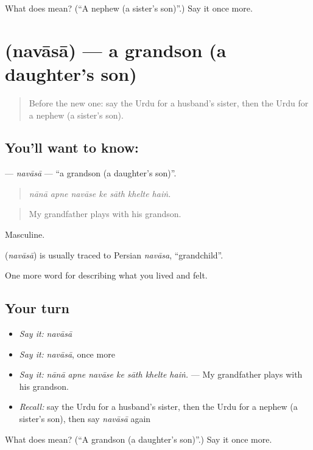 \begin{tcolorbox}[breakable,colback=teal!4,colframe=teal!35!black,title={Before you move on}]
What does  mean? (\textquotedblleft{}A nephew (a sister's son)\textquotedblright{}.) Say it once more.
\end{tcolorbox}
\section[\texorpdfstring{\ur{نواسا} (navāsā)}{نواسا (navāsā)}]{ (navāsā) — a grandson (a daughter's son)}

\label{lesson:UR-C489-navasa}



\begin{quote}
Before the new one: say the Urdu for a husband's sister, then the Urdu for a nephew (a sister's son).
\end{quote}

\subsection*{You'll want to know: }
\textbf{} — \emph{navāsā} — \textquotedblleft{}a grandson (a daughter's son)\textquotedblright{}.

\begin{quote}
      
\end{quote}

\begin{quote}
\emph{nānā apne navāse ke sāth khelte haiṅ.}
\end{quote}

\begin{quote}
My grandfather plays with his grandson.
\end{quote}

Masculine.

\begin{cousinweb}
\textbf{} (\emph{navāsā}) is usually traced to Persian \emph{navāsa}, \textquotedblleft{}grandchild\textquotedblright{}.
\end{cousinweb}

\begin{grammarlens}[title={What you've built}]
One more word for describing what you lived and felt.
\end{grammarlens}

\subsection*{Your turn}
\begin{itemize}
\raggedright
  \item \emph{Say it:} \emph{navāsā}
  \item \emph{Say it:} \emph{navāsā}, once more
  \item \emph{Say it:} \emph{nānā apne navāse ke sāth khelte haiṅ.} — My grandfather plays with his grandson.
  \item \emph{Recall:} say the Urdu for a husband's sister, then the Urdu for a nephew (a sister's son), then say \emph{navāsā} again
\end{itemize}

\begin{tcolorbox}[breakable,colback=teal!4,colframe=teal!35!black,title={Before you move on}]
What does  mean? (\textquotedblleft{}A grandson (a daughter's son)\textquotedblright{}.) Say it once more.
\end{tcolorbox}
